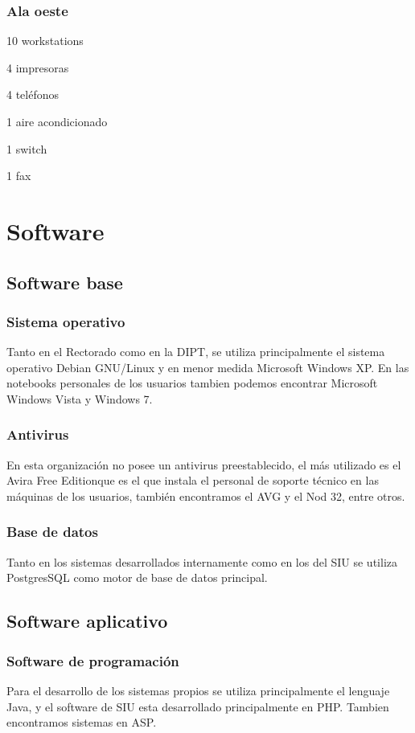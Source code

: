 \documentclass[a4paper,11pt,oneside]{article}
\begin{document}
\subsubsection*{Ala oeste}
\begin{itemize*}
\item 10 workstations
\item 4 impresoras
\item 4 teléfonos
\item 1 aire acondicionado
\item 1 switch
\item 1 fax
\end{itemize*}
%
\section{Software}
%
\subsection{Software base}
%
\subsubsection*{Sistema operativo}
Tanto en el Rectorado como en la DIPT, se utiliza principalmente el
sistema operativo Debian GNU/Linux y en menor medida Microsoft Windows
XP. En las notebooks personales de los usuarios tambien podemos
encontrar Microsoft Windows Vista y Windows 7.
%
\subsubsection*{Antivirus}
En esta organización no posee un antivirus preestablecido, el más
utilizado es el Avira Free Editionque es el que instala el personal de
soporte técnico en las máquinas de los usuarios, también encontramos
el AVG y el Nod 32, entre otros.
%
\subsubsection*{Base de datos}
%
Tanto en los sistemas desarrollados internamente como en los del SIU
se utiliza PostgresSQL como motor de base de datos principal.
%
\subsection*{Software aplicativo}
%
\subsubsection*{Software de programación}
%
Para el desarrollo de los sistemas propios se utiliza principalmente
el lenguaje Java, y el software de SIU esta desarrollado
principalmente en PHP. Tambien encontramos sistemas en ASP.
\end{document}
